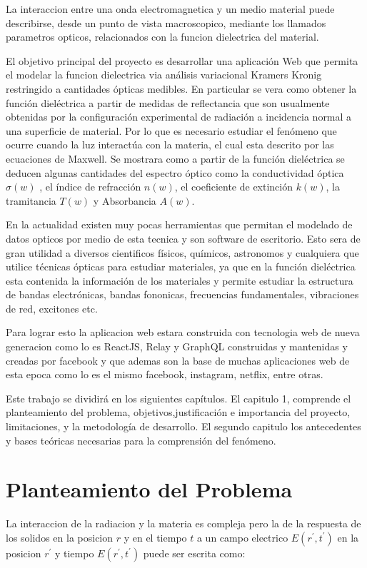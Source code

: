 \documentclass[a4paper,openright,12pt]{book}
\begin{document}
La interaccion entre una onda electromagnetica y un medio material puede describirse, desde un punto de vista macroscopico, mediante los llamados parametros opticos, relacionados con la funcion dielectrica del material. 

El objetivo principal del proyecto es desarrollar una aplicación Web que permita el modelar la funcion dielectrica via análisis variacional Kramers Kronig restringido a cantidades ópticas medibles. En particular se vera como obtener la función dieléctrica a partir de medidas de reflectancia que son usualmente obtenidas por la configuración experimental de radiación a incidencia normal a una superficie de material. Por lo que es necesario estudiar el fenómeno que ocurre cuando la luz interactúa con la materia, el cual esta descrito por las ecuaciones de Maxwell. Se mostrara como a partir de la función dieléctrica se deducen algunas cantidades del espectro óptico como la conductividad óptica $\sigma(w)$ , el índice de refracción $n(w)$, el coeficiente de extinción $k(w)$, la tramitancia $T(w)$ y Absorbancia  $A(w)$.

En la actualidad existen muy pocas herramientas que permitan el modelado de datos opticos por medio de esta tecnica y son software de escritorio. Esto sera de gran utilidad a diversos cientificos físicos, químicos, astronomos y cualquiera que utilice técnicas ópticas para estudiar materiales, ya que en la función dieléctrica esta contenida la información de los materiales y permite estudiar la estructura de bandas electrónicas, bandas fononicas, frecuencias fundamentales, vibraciones de red, excitones etc. 

Para lograr esto la aplicacion web estara construida con tecnologia web de nueva generacion como lo es ReactJS, Relay y GraphQL construidas y mantenidas y creadas por facebook y que ademas son la base de muchas aplicaciones web de esta epoca como lo es el mismo facebook, instagram, netflix, entre otras.

Este trabajo se dividirá en los siguientes capítulos. El capitulo 1, comprende el planteamiento del problema,  objetivos,justificación e importancia del proyecto, limitaciones, y la metodología de desarrollo. El segundo capitulo los antecedentes y bases teóricas  necesarias para la comprensión del fenómeno.  
\section{Planteamiento del Problema}


La interaccion de la radiacion y la materia es compleja pero la de la respuesta de los solidos en la posicion $r$ y en el tiempo $t$ a un campo electrico $E(r^{'},t^{'})$ en la posicion $r^{'}$ y tiempo $E(r^{'},t^{'})$  puede ser escrita como:
\end{document}
